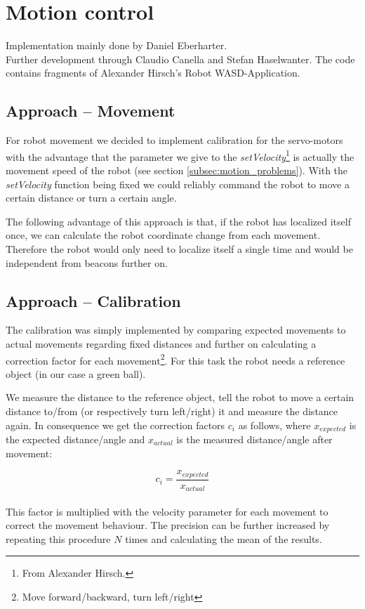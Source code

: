 \documentclass[703031]{iisreport}
\begin{document}
\section{Motion control}
\label{sec:motion}
Implementation mainly done by Daniel Eberharter.\\
Further development through Claudio Canella and Stefan Haselwanter.
The code contains fragments of Alexander Hirsch's Robot WASD-Application.

\subsection{Approach -- Movement}
For robot movement we decided to implement calibration for the servo-motors with the advantage that the parameter we give to the \emph{setVelocity}\footnote{From Alexander Hirsch.} is actually the movement speed of the robot (see section \ref{subsec:motion_problems}). With the \emph{setVelocity} function being fixed we could reliably command the robot to move a certain distance or turn a certain angle.

The following advantage of this approach is that, if the robot has localized itself once, we can calculate the robot coordinate change from each movement. Therefore the robot would only need to localize itself a single time and would be independent from beacons further on.

\subsection{Approach -- Calibration}
The calibration was simply implemented by comparing expected movements to actual movements regarding fixed distances and further on calculating a correction factor for each movement\footnote{Move forward/backward, turn left/right}. For this task the robot needs a reference object (in our case a green ball).

We measure the distance to the reference object, tell the robot to move a certain distance to/from (or respectively turn left/right) it and measure the distance again. In consequence
we get the correction factors $c_i$ as follows, where $x_{expected}$ is the expected distance/angle and $x_{actual}$ is the measured distance/angle after movement:

	\[c_i = \frac{x_{expected}}{x_{actual}}\]\\
This factor is multiplied with the velocity parameter for each movement to correct the movement behaviour. The precision can be further increased by repeating this procedure $N$ times and calculating the mean of the results.
\end{document}

